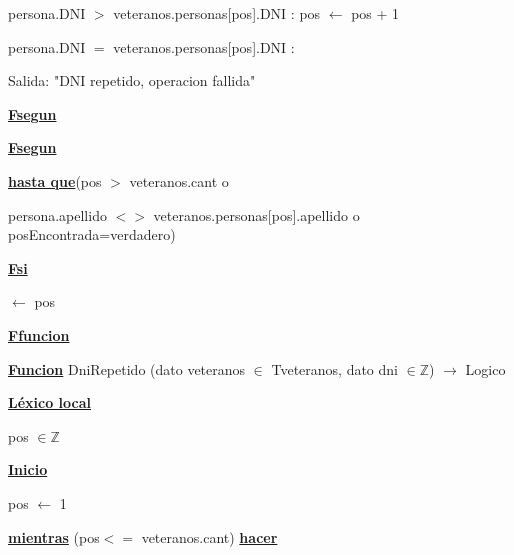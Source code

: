 \documentclass{article}
\begin{document}
                                \hspace{32mm} persona.DNI $>$ veteranos.personas[pos].DNI : pos $\leftarrow$ pos + 1

                                \hspace{32mm} persona.DNI $=$ veteranos.personas[pos].DNI : 

                                    \hspace{36mm} Salida: "DNI repetido, operacion fallida"

                            \hspace{28mm}\underline{\textbf{Fsegun}}

                    \hspace{20mm}\underline{\textbf{Fsegun}}

                \hspace{16mm}\underline{\textbf{hasta que}}(pos $>$ veteranos.cant o
                    
                    \hspace{24mm}persona.apellido $<>$ veteranos.personas[pos].apellido o posEncontrada=verdadero)

            \hspace{12mm}\underline{\textbf{Fsi}}

            \hspace{12mm}$\leftarrow$ pos

    \hspace{4mm}\underline{\textbf{Ffuncion}}

    \vspace{4mm}

    \hspace{4mm}\underline{\textbf{Funcion}} DniRepetido (dato veteranos $\in$ Tveteranos, dato dni $\in \mathbb{Z}$) $\rightarrow$ Logico

        \hspace{8mm}\underline{\textbf{Léxico local}}

            \hspace{12mm}pos $\in \mathbb{Z}$

        \hspace{8mm}\underline{\textbf{Inicio}}

            \hspace{12mm}pos $\leftarrow$ 1

            \hspace{12mm}\underline{\textbf{mientras}} (pos$<=$ veteranos.cant) \underline{\textbf{hacer}}
\end{document}
